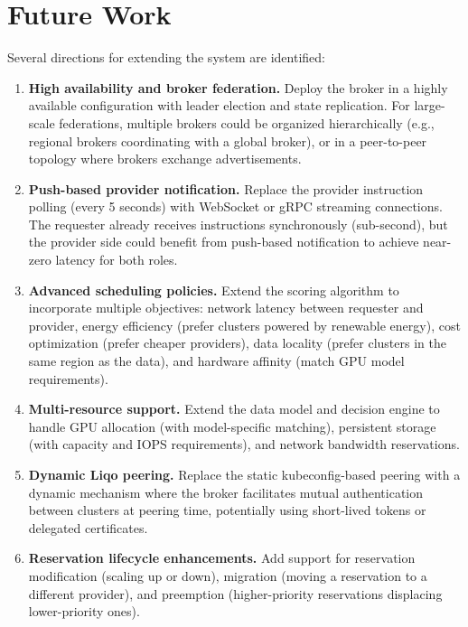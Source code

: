 \section{Future Work}
\label{sec:future-work}

Several directions for extending the system are identified:

\begin{enumerate}
    \item \textbf{High availability and broker federation.}
    Deploy the broker in a highly available configuration with leader election and state replication. For large-scale federations, multiple brokers could be organized hierarchically (e.g., regional brokers coordinating with a global broker), or in a peer-to-peer topology where brokers exchange advertisements.

    \item \textbf{Push-based provider notification.}
    Replace the provider instruction polling (every 5 seconds) with WebSocket or gRPC streaming connections. The requester already receives instructions synchronously (sub-second), but the provider side could benefit from push-based notification to achieve near-zero latency for both roles.

    \item \textbf{Advanced scheduling policies.}
    Extend the scoring algorithm to incorporate multiple objectives: network latency between requester and provider, energy efficiency (prefer clusters powered by renewable energy), cost optimization (prefer cheaper providers), data locality (prefer clusters in the same region as the data), and hardware affinity (match GPU model requirements).

    \item \textbf{Multi-resource support.}
    Extend the data model and decision engine to handle GPU allocation (with model-specific matching), persistent storage (with capacity and IOPS requirements), and network bandwidth reservations.

    \item \textbf{Dynamic Liqo peering.}
    Replace the static kubeconfig-based peering with a dynamic mechanism where the broker facilitates mutual authentication between clusters at peering time, potentially using short-lived tokens or delegated certificates.

    \item \textbf{Reservation lifecycle enhancements.}
    Add support for reservation modification (scaling up or down), migration (moving a reservation to a different provider), and preemption (higher-priority reservations displacing lower-priority ones).


\end{enumerate}
